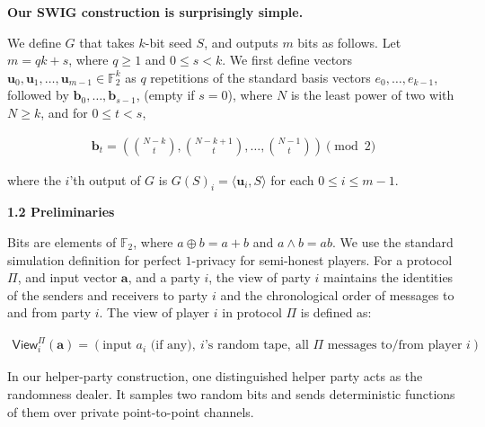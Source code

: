 \par\medskip\noindent\textbf{Our SWIG construction is surprisingly simple.}\par




We define $G$ that takes $k$-bit seed $S$, and outputs $m$ bits as follows.
Let $m=qk+s$, where $q\geq 1$ and $0\leq s<k$. We first define vectors $\mathbf{u}_{0},\mathbf{u}_{1},\ldots,\mathbf{u}_{m-1}\in\mathbb{F}_{2}^{k}$ as
$q$ repetitions of
the standard basis vectors $e_{0},\ldots,e_{k-1}$, followed by $\mathbf{b}_{0},\ldots,\mathbf{b}_{s-1}$, (empty if
$s=0$), where $N$ is the least power of two with $N\geq k$, and for
$0\leq t<s$,\par


\[\begin{gathered}
\mathbf{b}_{t}=\left(\binom{N-k}{t},\binom{N-k+1}{t},\ldots,\binom{N-1}{t}\right)\pmod{2}
\end{gathered}\]


where the $i$’th output of $G$ is
$G(S)_{i}=\langle\mathbf{u}_{i},S\rangle$ for each $0\leq i\leq m-1$.\par






\par\medskip\noindent\textbf{
1.2 Preliminaries}\par




Bits are elements of $\mathbb{F}_{2}$, where $a\oplus b=a+b$ and $a\wedge b=ab$.
We use the standard simulation definition for perfect $1$-privacy for semi-honest players. For a protocol $\Pi$, and input vector $\mathbf{a}$, and a party $i$, the view of party $i$ maintains the identities of the senders and receivers to party $i$ and the chronological order of messages to and from party $i$. The view of player $i$ in protocol $\Pi$ is defined as:\par


\[\begin{gathered}
\mathsf{View}_{i}^{\Pi}(\mathbf{a})=(\text{input }a_{i}\text{ (if any)},\ \text{$i$'s random tape},\ \text{all $\Pi$ messages to/from player $i$})
\end{gathered}\]


In our helper-party construction, one distinguished helper party acts as the randomness dealer. It samples two random bits and sends deterministic functions of them over private point-to-point channels.\par



